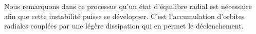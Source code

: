 Nous remarquons dans ce processus qu'un état d'équilibre radial est nécessaire afin que cette instabilité puisse se développer. C'est l'accumulation
d'orbites radiales couplées par une légère dissipation qui en permet le déclenchement.




